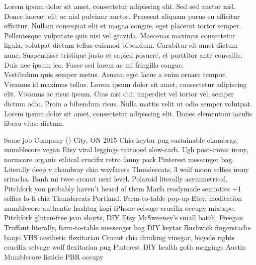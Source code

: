 \documentclass[letterpaper,11pt]{coaxialcv}
\begin{document}
  \makeheader%
    {}%
    {}%
    {}%
    {}%
    {}%
    {}%
    {}

  \minibio
    {Lorem ipsum dolor sit amet, consectetur adipiscing elit. Sed sed auctor nisl. Donec laoreet elit ac nisl 
    pulvinar auctor. Praesent aliquam purus eu efficitur efficitur. Nullam consequat elit et magna congue, eget 
    placerat tortor semper. Pellentesque vulputate quis nisi vel gravida. Maecenas maximus consectetur ligula, 
    volutpat dictum tellus euismod bibendum. Curabitur sit amet dictum nunc. Suspendisse tristique justo et sapien 
    posuere, et porttitor ante convallis. Duis nec ipsum leo. Fusce sed lorem ac mi fringilla congue.\\
    Vestibulum quis semper metus. Aenean eget lacus a enim ornare tempor. Vivamus id maximus tellus. Lorem ipsum 
    dolor sit amet, consectetur adipiscing elit. Vivamus ac risus ipsum. Cras nisi dui, imperdiet vel tortor vel, 
    semper dictum odio. Proin a bibendum risus. Nulla mattis velit ut odio semper volutpat. Lorem ipsum dolor sit 
    amet, consectetur adipiscing elit. Donec elementum iaculis libero vitae dictum.}

  \formerjob
    {Some job}
    {Company ()}
    {City, ON}
    {2015}
    {Chia keytar pug sustainable chambray, mumblecore vegan Etsy viral leggings tattooed slow-carb. Ugh post-ironic 
    irony, normcore organic ethical crucifix retro fanny pack Pinterest messenger bag. Literally deep v chambray chia 
    wayfarers Thundercats, 3 wolf moon selfies irony sriracha. Banh mi twee cronut next level. Polaroid literally 
    asymmetrical, Pitchfork you probably haven't heard of them Marfa readymade semiotics +1 selfies lo-fi chia 
    Thundercats Portland. Farm-to-table pop-up Etsy, meditation mumblecore authentic hashtag kogi iPhone selvage 
    crucifix occupy mixtape. Pitchfork gluten-free jean shorts, DIY Etsy McSweeney's small batch.}
  \workitems
  {Freegan Truffaut literally, farm-to-table messenger bag DIY keytar}
  {Bushwick fingerstache banjo VHS aesthetic flexitarian}
  {Cronut chia drinking vinegar, bicycle rights crucifix selvage wolf flexitarian pug Pinterest DIY health goth 
  meggings Austin}
  {Mumblecore listicle PBR occupy}
\end{document}
